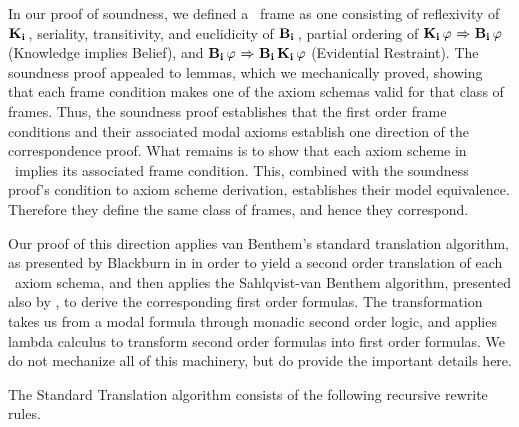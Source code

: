 In our proof of soundness, we defined a \DASL\ frame as one consisting of reflexivity of $\mathbf{K}_{\mathbf{i}}\,$, seriality, transitivity, and euclidicity of $\mathbf{B}_{\mathbf{i}}\,$, partial ordering of $\mathbf{K}_{\mathbf{i}}\,\varphi {\ \Rightarrow \ } \mathbf{B}_{\mathbf{i}}\,\varphi$ (Knowledge implies Belief), and $\mathbf{B}_{\mathbf{i}}\,\varphi {\ \Rightarrow \ } \mathbf{B}_{\mathbf{i}}\,\mathbf{K}_{\mathbf{i}}\,\varphi$ (Evidential Restraint). The soundness proof appealed to lemmas, which we mechanically proved, showing that each frame condition makes one of the axiom schemas valid for that class of frames. Thus, the soundness proof establishes that the first order frame conditions and their associated modal axioms establish one direction of the correspondence proof. What remains is to show that each axiom scheme in \DASL\ implies its associated frame condition. This, combined with the soundness proof's condition to axiom scheme derivation, establishes their model equivalence. Therefore they define the same class of frames, and hence they correspond.

Our proof of this direction applies van Benthem's standard translation algorithm, as presented by Blackburn \etal in \cite{modal} in order to yield a second order translation of each \DASL\ axiom schema, and then applies the Sahlqvist-van Benthem algorithm, presented also by \cite{modal}, to derive the corresponding first order formulas. The transformation takes us from a modal formula through monadic second order logic, and applies lambda calculus to transform second order formulas into first order formulas. We do not mechanize all of this machinery, but do provide the important details here.

The Standard Translation algorithm consists of the following recursive rewrite rules.

